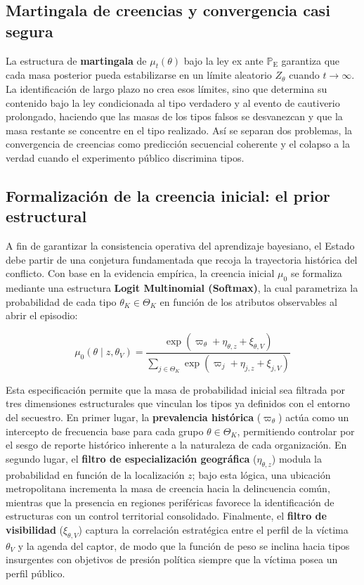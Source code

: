 \documentclass[12pt]{article}
\theoremstyle{definition}
\theoremstyle{remark}
\newcommand{\ProbE}{\mathbb{P}_{\mathrm{E}}}
\newcommand{\1}{\mathbf{1}}
\begin{document}
\subsection{Martingala de creencias y convergencia casi segura}

La estructura de \textbf{martingala} de $\mu_t(\theta)$ bajo la ley ex ante $\ProbE$ garantiza que cada masa posterior pueda estabilizarse en un límite aleatorio $Z_\theta$ cuando $t\to\infty$. La identificación de largo plazo no crea esos límites, sino que determina su contenido bajo la ley condicionada al tipo verdadero y al evento de cautiverio prolongado, haciendo que las masas de los tipos falsos se desvanezcan y que la masa restante se concentre en el tipo realizado. Así se separan dos problemas, la convergencia de creencias como predicción secuencial coherente y el colapso a la verdad cuando el experimento público discrimina tipos.

\subsection{Formalización de la creencia inicial: el prior estructural}
\label{subsec:prior-estructural}

A fin de garantizar la consistencia operativa del aprendizaje bayesiano, el Estado debe partir de una conjetura fundamentada que recoja la trayectoria histórica del conflicto. Con base en la evidencia empírica, la creencia inicial $\mu_0$ se formaliza mediante una estructura \textbf{Logit Multinomial (Softmax)}, la cual parametriza la probabilidad de cada tipo $\theta_K \in \Theta_K$ en función de los atributos observables al abrir el episodio:

\begin{equation}
\label{eq:prior-initial-softmax}
\mu_0(\theta \mid z, \theta_V) = \frac{\exp\left( \varpi_\theta + \eta_{\theta,z} + \xi_{\theta,V} \right)}{\sum_{j \in \Theta_K} \exp\left( \varpi_j + \eta_{j,z} + \xi_{j,V} \right)}
\end{equation}

Esta especificación permite que la masa de probabilidad inicial sea filtrada por tres dimensiones estructurales que vinculan los tipos ya definidos con el entorno del secuestro. En primer lugar, la \textbf{prevalencia histórica} ($\varpi_\theta$) actúa como un intercepto de frecuencia base para cada grupo $\theta \in \Theta_K$, permitiendo controlar por el sesgo de reporte histórico inherente a la naturaleza de cada organización. En segundo lugar, el \textbf{filtro de especialización geográfica} ($\eta_{\theta,z}$) modula la probabilidad en función de la localización $z$; bajo esta lógica, una ubicación metropolitana incrementa la masa de creencia hacia la delincuencia común, mientras que la presencia en regiones periféricas favorece la identificación de estructuras con un control territorial consolidado. Finalmente, el \textbf{filtro de visibilidad} ($\xi_{\theta,V}$) captura la correlación estratégica entre el perfil de la víctima $\theta_V$ y la agenda del captor, de modo que la función de peso se inclina hacia tipos insurgentes con objetivos de presión política siempre que la víctima posea un perfil público.
\end{document}
